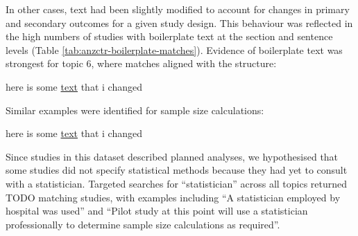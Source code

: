 \documentclass[12pt]{article}
\begin{document}
In other cases, text had been slightly modified to account for changes in primary and secondary outcomes for a given study design. This behaviour was reflected in the high numbers of studies with boilerplate text at the section and sentence levels (Table \ref{tab:anzctr-boilerplate-matches}). Evidence of boilerplate text was strongest for topic 6, where matches aligned with the structure:

\begin{center}
here is some \underline{text} that i changed
\end{center}

Similar examples were identified for sample size calculations:

\begin{center}
here is some \underline{text} that i changed
\end{center}


Since studies in this dataset described planned analyses, we
hypothesised that some studies did not specify statistical methods because
they had yet to consult with a statistician. Targeted searches for ``statistician'' across all topics returned TODO matching studies,
with examples including ``A statistician employed by hospital was used''
and ``Pilot study at this point will use a statistician professionally
to determine sample size calculations as required''.
\end{document}
